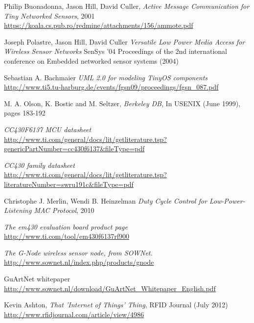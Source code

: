 \begin{thebibliography}{99}

 Philip Buonadonna, Jason Hill, David Culler, \textit{Active Message Communication for Tiny Networked Sensors}, 2001 \\ \url{https://koala.cs.pub.ro/redmine/attachments/156/ammote.pdf}

 Joseph Polastre, Jason Hill, David Culler \textit{Versatile Low Power Media Access for Wireless Sensor Networks} SenSys '04 Proceedings of the 2nd international conference on Embedded networked sensor systems (2004)

 Sebastian A. Bachmaier \textit{UML 2.0 for modeling TinyOS components} \\ \url{http://www.ti5.tu-harburg.de/events/fgsn09/proceedings/fgsn_087.pdf}

 M. A. Olson, K. Bostic and M. Seltzer, \textit{Berkeley DB}, In USENIX (June 1999), pages 183-192

 \textit{CC430F6137 MCU datasheet} \\ \url{http://www.ti.com/general/docs/lit/getliterature.tsp?genericPartNumber=cc430f6137&fileType=pdf}

 \textit{CC430 family datasheet}\\ \url{http://www.ti.com/general/docs/lit/getliterature.tsp?literatureNumber=swru191c&fileType=pdf}

 Christophe J. Merlin, Wendi B. Heinzelman \textit{Duty Cycle Control for Low-Power-Listening MAC Protocol}, 2010 

 \textit{The em430 evaluation board product page} \\ \url{http://www.ti.com/tool/em430f6137rf900}

 \textit{The G-Node wireless sensor node, from SOWNet.} \\ \url{http://www.sownet.nl/index.php/products/gnode}

 GuArtNet whitepaper \url{http://www.sownet.nl/download/GuArtNet\_Whitepaper\_English.pdf}

 Kevin Ashton, \textit{That 'Internet of Things' Thing}, RFID Journal (July 2012) \url{http://www.rfidjournal.com/article/view/4986}


\end{thebibliography}
